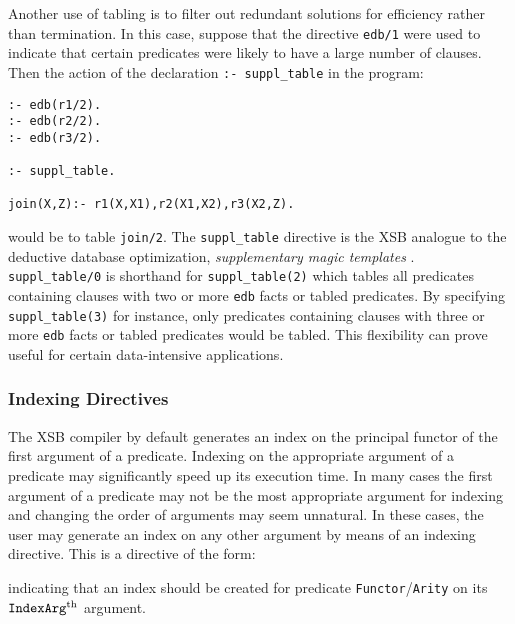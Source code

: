Another use of tabling is to filter out redundant solutions for
efficiency rather than termination.  In this case, suppose that the
directive {\tt edb/1} were used to indicate that certain predicates were
likely to have a large number of clauses.  Then the action of the declaration
{\tt :- suppl\_table} in the program:
\begin{verbatim}
:- edb(r1/2).
:- edb(r2/2).
:- edb(r3/2).

:- suppl_table.

join(X,Z):- r1(X,X1),r2(X1,X2),r3(X2,Z).
\end{verbatim}
would be to table {\tt join/2}.  The {\tt suppl\_table} directive is
the XSB analogue to the deductive database optimization, {\em
supplementary magic templates} \cite{BeRa91}.  {\tt suppl\_table/0} is
shorthand for {\tt suppl\_table(2)} which tables all predicates
containing clauses with two or more {\tt edb} facts or tabled
predicates.  By specifying {\tt suppl\_table(3)} for instance, only
predicates containing clauses with three or more {\tt edb} facts or
tabled predicates would be tabled.  This flexibility can prove useful
for certain data-intensive applications.


\subsubsection{Indexing Directives}\label{indexing_directives}

The XSB compiler by default generates an index on the principal 
functor of the first argument of a predicate.  Indexing on the appropriate 
argument of a predicate may significantly speed up its execution time.  
In many cases the first argument of a predicate may not be the most
appropriate argument for indexing and changing the order of arguments
may seem unnatural.  In these cases, the user may generate an index
on any other argument by means of an indexing directive.  This is a
directive of the form:


\noindent
indicating that an index should be created for predicate 
{\tt Functor}/{\tt Arity} on its ${\tt IndexArg}^{\rm th}$ argument.

%
%

